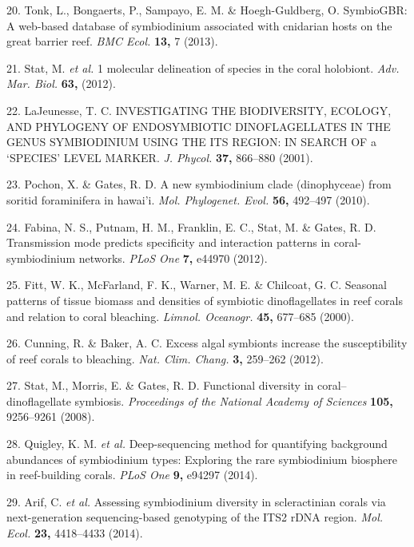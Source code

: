 \documentclass[]{article}
\begin{document}
\hypertarget{ref-Tonk2013-pf}{}
20. Tonk, L., Bongaerts, P., Sampayo, E. M. \& Hoegh-Guldberg, O.
SymbioGBR: A web-based database of symbiodinium associated with
cnidarian hosts on the great barrier reef. \emph{BMC Ecol.} \textbf{13,}
7 (2013).

\hypertarget{ref-Stat2012-gw}{}
21. Stat, M. \emph{et al.} 1 molecular delineation of species in the
coral holobiont. \emph{Adv. Mar. Biol.} \textbf{63,} (2012).

\hypertarget{ref-LaJeunesse2001-hf}{}
22. LaJeunesse, T. C. INVESTIGATING THE BIODIVERSITY, ECOLOGY, AND
PHYLOGENY OF ENDOSYMBIOTIC DINOFLAGELLATES IN THE GENUS SYMBIODINIUM
USING THE ITS REGION: IN SEARCH OF a `SPECIES' LEVEL MARKER. \emph{J.
Phycol.} \textbf{37,} 866--880 (2001).

\hypertarget{ref-Pochon2010-jm}{}
23. Pochon, X. \& Gates, R. D. A new symbiodinium clade (dinophyceae)
from soritid foraminifera in hawai'i. \emph{Mol. Phylogenet. Evol.}
\textbf{56,} 492--497 (2010).

\hypertarget{ref-Fabina2012-mm}{}
24. Fabina, N. S., Putnam, H. M., Franklin, E. C., Stat, M. \& Gates, R.
D. Transmission mode predicts specificity and interaction patterns in
coral-symbiodinium networks. \emph{PLoS One} \textbf{7,} e44970 (2012).

\hypertarget{ref-Fitt2000-ex}{}
25. Fitt, W. K., McFarland, F. K., Warner, M. E. \& Chilcoat, G. C.
Seasonal patterns of tissue biomass and densities of symbiotic
dinoflagellates in reef corals and relation to coral bleaching.
\emph{Limnol. Oceanogr.} \textbf{45,} 677--685 (2000).

\hypertarget{ref-Cunning2012-um}{}
26. Cunning, R. \& Baker, A. C. Excess algal symbionts increase the
susceptibility of reef corals to bleaching. \emph{Nat. Clim. Chang.}
\textbf{3,} 259--262 (2012).

\hypertarget{ref-Stat2008-hk}{}
27. Stat, M., Morris, E. \& Gates, R. D. Functional diversity in
coral--dinoflagellate symbiosis. \emph{Proceedings of the National
Academy of Sciences} \textbf{105,} 9256--9261 (2008).

\hypertarget{ref-Quigley2014-zj}{}
28. Quigley, K. M. \emph{et al.} Deep-sequencing method for quantifying
background abundances of symbiodinium types: Exploring the rare
symbiodinium biosphere in reef-building corals. \emph{PLoS One}
\textbf{9,} e94297 (2014).

\hypertarget{ref-Arif2014-kx}{}
29. Arif, C. \emph{et al.} Assessing symbiodinium diversity in
scleractinian corals via next-generation sequencing-based genotyping of
the ITS2 rDNA region. \emph{Mol. Ecol.} \textbf{23,} 4418--4433 (2014).
\end{document}
